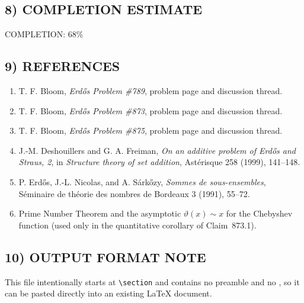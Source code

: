 \subsection*{8) COMPLETION ESTIMATE}

COMPLETION: 68\%

\subsection*{9) REFERENCES}

\begin{enumerate}
\item T. F. Bloom, \emph{Erd\H{o}s Problem \#789}, problem page and discussion thread.
\item T. F. Bloom, \emph{Erd\H{o}s Problem \#873}, problem page and discussion thread.
\item T. F. Bloom, \emph{Erd\H{o}s Problem \#875}, problem page and discussion thread.
\item J.-M. Deshouillers and G. A. Freiman, \emph{On an additive problem of Erd\H{o}s and Straus, 2}, in \emph{Structure theory of set addition}, Ast\'erisque 258 (1999), 141--148.
\item P. Erd\H{o}s, J.-L. Nicolas, and A. S\'ark\H{o}zy, \emph{Sommes de sous-ensembles}, S\'eminaire de th\'eorie des nombres de Bordeaux 3 (1991), 55--72.
\item Prime Number Theorem and the asymptotic \(\vartheta(x)\sim x\) for the Chebyshev function (used only in the quantitative corollary of Claim~873.1).
\end{enumerate}

\subsection*{10) OUTPUT FORMAT NOTE}

This file intentionally starts at \verb|\section| and contains no preamble and no \verb||, so it can be pasted directly into an existing LaTeX document.

